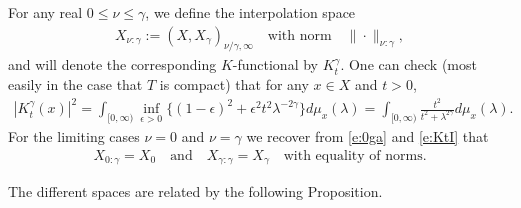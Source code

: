 \documentclass[10pt, a4paper]{iopart}
\newcommand{\norm}[2]{     \| #1       \|_{ #2 }}
\newcommand{\normiii}[2]{\vert\kern-0.25ex\vert\kern-0.25ex\vert #1 \vert\kern-0.25ex \vert\kern-0.25ex\vert_{ #2 }}
\theoremstyle{remark}
\theoremstyle{definition}
\begin{document}
%

%

For any real $0 \leq \nu \leq \gamma$,
we define
the interpolation space
\begin{align}
	X_{\nu : \gamma}
	:=
	( X, X_\gamma )_{\nu/\gamma, \infty}
	\quad\text{with norm}\quad
	\norm{\cdot}{\nu : \gamma}
	,
\end{align}
and will denote the corresponding $K$-functional by $K_t^\gamma$.
%
One can check
(most easily in the case that $T$ is compact)
that
for any $x \in X$ and $t > 0$,
\begin{align}
\label{e:KtI}
	| K_t^\gamma(x) |^2
=
	\int_{[0, \infty)}
	\inf_{\epsilon > 0}
	\{
		(1 - \epsilon)^2
		+
		\epsilon^2 
		t^2 
		\lambda^{-2 \gamma}
	\}
	d\mu_{x}(\lambda)
=
	\int_{[0, \infty)}
	\frac{t^2}{t^2 + \lambda^{2 \gamma}}
	d\mu_{x}(\lambda)
	.
\end{align}
%
%
For the limiting cases $\nu = 0$ and $\nu = \gamma$
we recover from \eqref{e:0ga} and \eqref{e:KtI}
that
\begin{align}
\label{e:X01}
	X_{0 : \gamma} = X_0
	\quad\text{and}\quad
	X_{\gamma : \gamma} = X_\gamma
	\quad
	\text{with equality of norms}
	.
\end{align}
%
%
%
%






The different spaces are related by the following Proposition.
\end{document}
